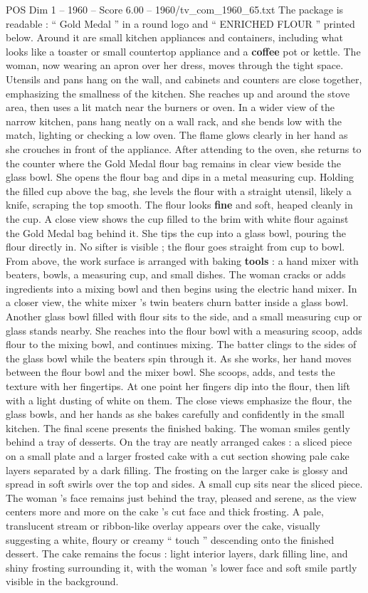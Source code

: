 \begin{textsample}{POS Dim 1 – 1960 – Score 6.00 – 1960/tv\_com\_1960\_65.txt}
The package is readable : “ Gold Medal ” in a round logo and “ ENRICHED FLOUR ” printed below.
Around it are small kitchen appliances and containers, including what looks like a toaster or small countertop appliance and a \textbf{coffee} pot or kettle.
The woman, now wearing an apron over her dress, moves through the tight space.
Utensils and pans hang on the wall, and cabinets and counters are close together, emphasizing the smallness of the kitchen.
She reaches up and around the stove area, then uses a lit match near the burners or oven.
In a wider view of the narrow kitchen, pans hang neatly on a wall rack, and she bends low with the match, lighting or checking a low oven.
The flame glows clearly in her hand as she crouches in front of the appliance.
After attending to the oven, she returns to the counter where the Gold Medal flour bag remains in clear view beside the glass bowl.
She opens the flour bag and dips in a metal measuring cup.
Holding the filled cup above the bag, she levels the flour with a straight utensil, likely a knife, scraping the top smooth.
The flour looks \textbf{fine} and soft, heaped cleanly in the cup.
A close view shows the cup filled to the brim with white flour against the Gold Medal bag behind it.
She tips the cup into a glass bowl, pouring the flour directly in.
No sifter is visible ; the flour goes straight from cup to bowl.
From above, the work surface is arranged with baking \textbf{tools} : a hand mixer with beaters, bowls, a measuring cup, and small dishes.
The woman cracks or adds ingredients into a mixing bowl and then begins using the electric hand mixer.
In a closer view, the white mixer ’s twin beaters churn batter inside a glass bowl.
Another glass bowl filled with flour sits to the side, and a small measuring cup or glass stands nearby.
She reaches into the flour bowl with a measuring scoop, adds flour to the mixing bowl, and continues mixing.
The batter clings to the sides of the glass bowl while the beaters spin through it.
As she works, her hand moves between the flour bowl and the mixer bowl.
She scoops, adds, and tests the texture with her fingertips.
At one point her fingers dip into the flour, then lift with a light dusting of white on them.
The close views emphasize the flour, the glass bowls, and her hands as she bakes carefully and confidently in the small kitchen.
The final scene presents the finished baking.
The woman smiles gently behind a tray of desserts.
On the tray are neatly arranged cakes : a sliced piece on a small plate and a larger frosted cake with a cut section showing pale cake layers separated by a dark filling.
The frosting on the larger cake is glossy and spread in soft swirls over the top and sides.
A small cup sits near the sliced piece.
The woman ’s face remains just behind the tray, pleased and serene, as the view centers more and more on the cake ’s cut face and thick frosting.
A pale, translucent stream or ribbon-like overlay appears over the cake, visually suggesting a white, floury or creamy “ touch ” descending onto the finished dessert.
The cake remains the focus : light interior layers, dark filling line, and shiny frosting surrounding it, with the woman ’s lower face and soft smile partly visible in the background.


\end{textsample}
